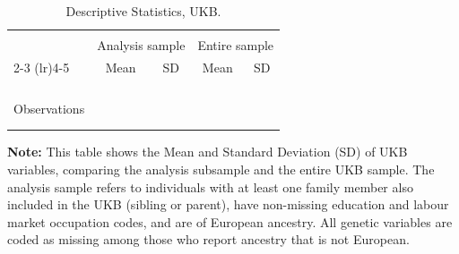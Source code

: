 \begin{table}[!htp]
    \vskip-0.75cm
    \singlespacing
    \centering
    \small
    \caption{Descriptive Statistics, UKB.}
    \vskip-0.25cm
    \begin{tabular}{l c c c c}
        \\[-1.8ex]\hline \hline \\[-1.8ex] 
            & \multicolumn{2}{c}{Analysis sample}
            & \multicolumn{2}{c}{Entire sample} \\
        \cmidrule(lr){2-3} \cmidrule(lr){4-5}
        & Mean & SD & Mean & SD \\
        \\[-1.8ex]\hline \\[-1.8ex]
        
        \\[-1.8ex]\hline \\[-1.8ex]
        Observations
            &  &
            &  & \\
        \\[-1.8ex]\hline \\[-1.8ex]
    \end{tabular}
    \vspace{-0.25cm}
    \label{tab:ukb-summary}
    \justify
    \footnotesize
    \textbf{Note:}
    This table shows the Mean and Standard Deviation (SD) of UKB variables, comparing the analysis subsample and the entire UKB sample.
    The analysis sample refers to individuals with at least one family member also included in the UKB (sibling or parent), have non-missing education and labour market occupation codes, and are of European ancestry.
    All genetic variables are coded as missing among those who report ancestry that is not European.
\end{table}

